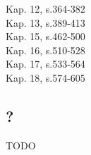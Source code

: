 Kap. 12, s.364-382 \\
Kap. 13, s.389-413 \\
Kap. 15, s.462-500 \\
Kap. 16, s.510-528 \\
Kap. 17, s.533-564 \\
Kap. 18, s.574-605

\subsection{?}
TODO
